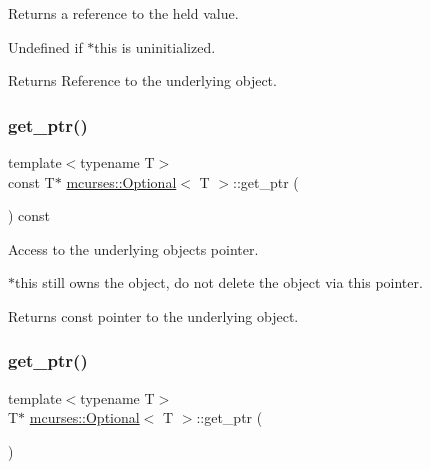 Returns a reference to the held value. 

Undefined if $\ast$this is uninitialized. \begin{DoxyReturn}{Returns}
Reference to the underlying object. 
\end{DoxyReturn}
\hypertarget{classmcurses_1_1Optional_ac1c01b2ccf9aa96c1e5f91d78bdbc928}{}\label{classmcurses_1_1Optional_ac1c01b2ccf9aa96c1e5f91d78bdbc928} 
\subsubsection{\texorpdfstring{get\+\_\+ptr()}{get\_ptr()}\hspace{0.1cm}{\footnotesize\ttfamily [1/2]}}
{\footnotesize\ttfamily template$<$typename T$>$ \\
const T$\ast$ \hyperlink{classmcurses_1_1Optional}{mcurses\+::\+Optional}$<$ T $>$\+::get\+\_\+ptr (\begin{DoxyParamCaption}{ }\end{DoxyParamCaption}) const\hspace{0.3cm}{\ttfamily [inline]}}



Access to the underlying object\textquotesingle{}s pointer. 

$\ast$this still owns the object, do not delete the object via this pointer. \begin{DoxyReturn}{Returns}
const pointer to the underlying object. 
\end{DoxyReturn}
\hypertarget{classmcurses_1_1Optional_a7f9c56ad08329b814a314d741e92fa59}{}\label{classmcurses_1_1Optional_a7f9c56ad08329b814a314d741e92fa59} 
\subsubsection{\texorpdfstring{get\+\_\+ptr()}{get\_ptr()}\hspace{0.1cm}{\footnotesize\ttfamily [2/2]}}
{\footnotesize\ttfamily template$<$typename T$>$ \\
T$\ast$ \hyperlink{classmcurses_1_1Optional}{mcurses\+::\+Optional}$<$ T $>$\+::get\+\_\+ptr (\begin{DoxyParamCaption}{ }\end{DoxyParamCaption})\hspace{0.3cm}{\ttfamily [inline]}}



